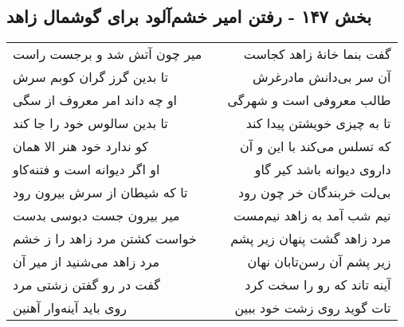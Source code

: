 \begin{center}
\section*{بخش ۱۴۷ - رفتن امیر خشم‌آلود برای گوشمال زاهد}
\label{sec:sh147}
\begin{longtable}{l p{0.5cm} r}
میر چون آتش شد و برجست راست
&&
گفت بنما خانهٔ زاهد کجاست
\\
تا بدین گرز گران کوبم سرش
&&
آن سر بی‌دانش مادرغرش
\\
او چه داند امر معروف از سگی
&&
طالب معروفی است و شهرگی
\\
تا بدین سالوس خود را جا کند
&&
تا به چیزی خویشتن پیدا کند
\\
کو ندارد خود هنر الا همان
&&
که تسلس می‌کند با این و آن
\\
او اگر دیوانه است و فتنه‌کاو
&&
داروی دیوانه باشد کیر گاو
\\
تا که شیطان از سرش بیرون رود
&&
بی‌لت خربندگان خر چون رود
\\
میر بیرون جست دبوسی بدست
&&
نیم شب آمد به زاهد نیم‌مست
\\
خواست کشتن مرد زاهد را ز خشم
&&
مرد زاهد گشت پنهان زیر پشم
\\
مرد زاهد می‌شنید از میر آن
&&
زیر پشم آن رسن‌تابان نهان
\\
گفت در رو گفتن زشتی مرد
&&
آینه تاند که رو را سخت کرد
\\
روی باید آینه‌وار آهنین
&&
تات گوید روی زشت خود ببین
\\
\end{longtable}
\end{center}
